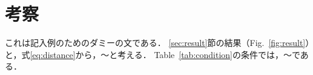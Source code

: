 \chapter{考察}
\label{chap:discussion}

これは記入例のためのダミーの文である．
\ref{sec:result}節の結果（Fig.~\ref{fig:result}）と，式\eqref{eq:distance}から，〜と考える．
Table~\ref{tab:condition}の条件では，〜である．
